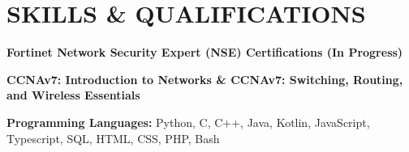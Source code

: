 \section{\color{airforceblue}SKILLS \& QUALIFICATIONS}
\begin{itemize}[leftmargin=0in, label={}]
    \small{\item{
        \textbf{\normalsize{Fortinet Network Security Expert (NSE) Certifications (In Progress) }} \\
        \vspace{1.2pt}
    
        \textbf{\normalsize{CCNAv7: Introduction to Networks \& CCNAv7: Switching, Routing, and Wireless Essentials }} \\
        \vspace{1.2pt}

        \textbf{\normalsize{Programming Languages:}}{ \normalsize{Python, C, C++, Java, Kotlin, JavaScript, Typescript, SQL, HTML, CSS, PHP, Bash}} \\
        \vspace{1.2pt}
    }}
\end{itemize}
\vspace{-16pt}
